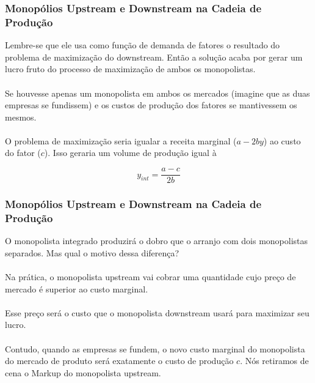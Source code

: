\documentclass{beamer}[10]
\begin{document}
\begin{frame}
	\frametitle{Monopólios Upstream e Downstream na Cadeia de Produção}

	Lembre-se que ele usa como função de demanda de fatores o resultado do problema de maximização do downstream. Então a solução acaba por gerar um lucro fruto do processo de maximização de ambos os monopolistas.
	\\~\\
	Se houvesse apenas um monopolista em ambos os mercados (imagine que as duas empresas se fundissem) e os custos de produção dos fatores se mantivessem os mesmos.
	\\~\\
	O problema de maximização seria igualar a receita marginal ($a - 2by$) ao custo do fator ($c$). Isso geraria um volume de produção igual à

	$$ y_{int} = \frac{a - c}{2b}$$

\end{frame}

\begin{frame}
	\frametitle{Monopólios Upstream e Downstream na Cadeia de Produção}

	O monopolista integrado produzirá o dobro que o arranjo com dois monopolistas separados. Mas qual o motivo dessa diferença?
	\\~\\
	Na prática, o monopolista upstream vai cobrar uma quantidade cujo preço de mercado é superior ao custo marginal. 
	\\~\\
	Esse preço será o custo que o monopolista downstream usará para maximizar seu lucro. 
	\\~\\
	Contudo, quando as empresas se fundem, o novo custo marginal do monopolista do mercado de produto será exatamente o custo de produção $c$. Nós retiramos de cena o Markup do monopolista upstream.

\end{frame}

\begin{frame}
	\frametitle{}

	

\end{frame}

\end{document}
